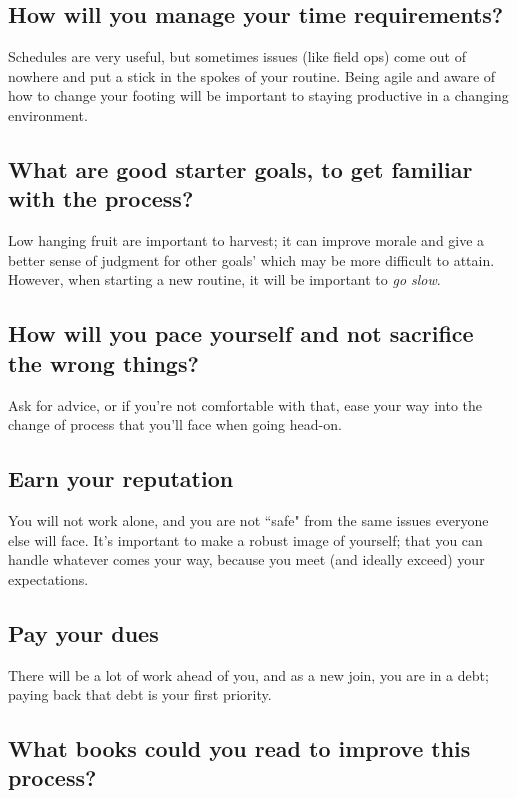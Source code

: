 \subsection{How will you manage your time requirements?}

Schedules are very useful, but sometimes issues (like field ops) come out of
nowhere and put a stick in the spokes of your routine. Being agile and aware
of how to change your footing will be important to staying productive in a
changing environment.

\subsection{What are good starter goals, to get familiar with the process?}

Low hanging fruit are important to harvest; it can improve morale and give
a better sense of judgment for other goals' which may be more difficult to
attain. However, when starting a new routine, it will be important to
\textit{go slow}.

\subsection{How will you pace yourself and not sacrifice the wrong things?}

Ask for advice, or if you're not comfortable with that, ease your way into the
change of process that you'll face when going head-on.

\subsection{Earn your reputation}

You will not work alone, and you are not ``safe" from the same issues everyone
else will face. It's important to make a robust image of yourself; that you can
handle whatever comes your way, because you meet (and ideally exceed) your
expectations.

\subsection{Pay your dues}

There will be a lot of work ahead of you, and as a new join, you are in a debt;
paying back that debt is your first priority.

\subsection{What books could you read to improve this process?}


